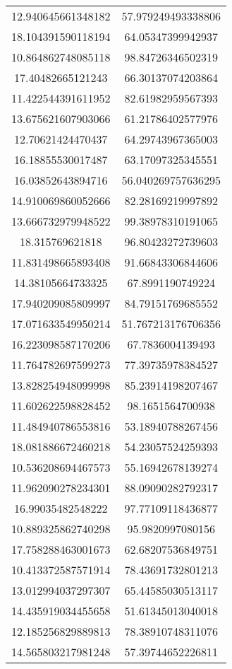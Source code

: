 \begin{table}
\begin{tabular}{cc}
12.940645661348182 & 57.979249493338806 \\
18.104391590118194 & 64.05347399942937 \\
10.864862748085118 & 98.84726346502319 \\
17.40482665121243 & 66.30137074203864 \\
11.422544391611952 & 82.61982959567393 \\
13.675621607903066 & 61.21786402577976 \\
12.70621424470437 & 64.29743967365003 \\
16.18855530017487 & 63.17097325345551 \\
16.03852643894716 & 56.040269757636295 \\
14.910069860052666 & 82.28169219997892 \\
13.666732979948522 & 99.38978310191065 \\
18.315769621818 & 96.80423272739603 \\
11.831498665893408 & 91.66843306844606 \\
14.38105664733325 & 67.8991190749224 \\
17.940209085809997 & 84.79151769685552 \\
17.071633549950214 & 51.767213176706356 \\
16.223098587170206 & 67.7836004139493 \\
11.764782697599273 & 77.39735978384527 \\
13.828254948099998 & 85.23914198207467 \\
11.602622598828452 & 98.1651564700938 \\
11.484940786553816 & 53.18940788267456 \\
18.081886672460218 & 54.23057524259393 \\
10.536208694467573 & 55.16942678139274 \\
11.962090278234301 & 88.09090282792317 \\
16.99035482548222 & 97.77109118436877 \\
10.889325862740298 & 95.9820997080156 \\
17.758288463001673 & 62.68207536849751 \\
10.413372587571914 & 78.43691732801213 \\
13.012994037297307 & 65.44585030513117 \\
14.435919034455658 & 51.61345013040018 \\
12.185256829889813 & 78.38910748311076 \\
14.565803217981248 & 57.39744652226811 \\

\end{tabular}
\end{table}
